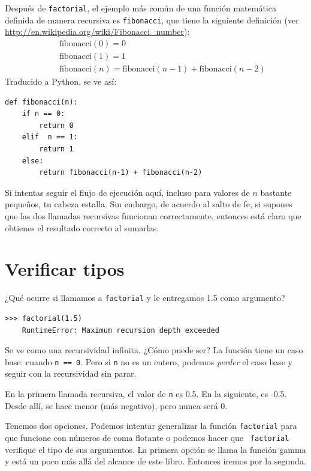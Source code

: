\documentclass[10pt]{book}
\begin{document}
Después de {\tt factorial}, el ejemplo más común de una función
matemática definida de manera recursiva es {\tt fibonacci}, que tiene la
siguiente definición (ver
  \url{http://en.wikipedia.org/wiki/Fibonacci_number}):
%
\begin{eqnarray*}
&& \mathrm{fibonacci}(0) = 0 \\
&& \mathrm{fibonacci}(1) = 1 \\
&& \mathrm{fibonacci}(n) = \mathrm{fibonacci}(n-1) + \mathrm{fibonacci}(n-2)
\end{eqnarray*}
%
Traducido a Python, se ve así:

\begin{verbatim}
def fibonacci(n):
    if n == 0:
        return 0
    elif  n == 1:
        return 1
    else:
        return fibonacci(n-1) + fibonacci(n-2)
\end{verbatim}
%
Si intentas seguir el flujo de ejecución aquí, incluso para valores
de $n$ bastante pequeños, tu cabeza estalla.  Sin embargo, de acuerdo al
salto de fe, si supones que las dos llamadas recursivas
funcionan correctamente, entonces está claro que obtienes
el resultado correcto al sumarlas.


\section{Verificar tipos}
\label{guardian}

¿Qué ocurre si llamamos a {\tt factorial} y le entregamos 1.5 como argumento?

\begin{verbatim}
>>> factorial(1.5)
    RuntimeError: Maximum recursion depth exceeded
\end{verbatim}
%
Se ve como una recursividad infinita.  ¿Cómo puede ser?  La función
tiene un caso base: cuando {\tt n == 0}.  Pero si {\tt n} no es un entero,
podemos {\em perder} el caso base y seguir con la recursividad sin parar.

En la primera llamada recursiva, el valor de {\tt n} es 0.5.
En la siguiente, es -0.5.  Desde allí, se hace menor
(más negativo), pero nunca será 0.

Tenemos dos opciones.  Podemos intentar generalizar la función {\tt factorial}
para que funcione con números de coma flotante o podemos hacer que {\tt
  factorial} verifique el tipo de sus argumentos.  La primera opción se
llama la función gamma y está
un poco más allá del alcance de este libro.  Entonces iremos por la segunda.
\end{document}
